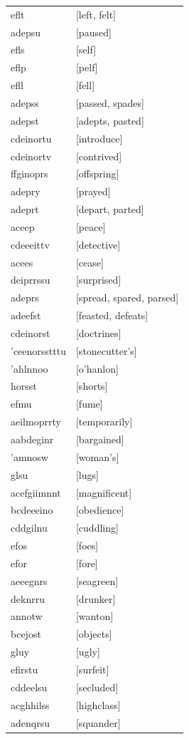 \documentclass{article}
\begin{document}
\begin{tabular}{ll}
eflt & [left, felt] \\
adepsu & [paused] \\
efls & [self] \\
eflp & [pelf] \\
efll & [fell] \\
adepss & [passed, spades] \\
adepst & [adepts, pasted] \\
cdeinortu & [introduce] \\
cdeinortv & [contrived] \\
ffginoprs & [offspring] \\
adepry & [prayed] \\
adeprt & [depart, parted] \\
aceep & [peace] \\
cdeeeittv & [detective] \\
acees & [cease] \\
deiprrssu & [surprised] \\
adeprs & [spread, spared, parsed] \\
adeefst & [feasted, defeats] \\
cdeinorst & [doctrines] \\
'ceenorsstttu & [stonecutter's] \\
'ahlnnoo & [o'hanlon] \\
horsst & [shorts] \\
efmu & [fume] \\
aeilmoprrty & [temporarily] \\
aabdeginr & [bargained] \\
'amnosw & [woman's] \\
glsu & [lugs] \\
acefgiimnnt & [magnificent] \\
bcdeeeino & [obedience] \\
cddgilnu & [cuddling] \\
efos & [foes] \\
efor & [fore] \\
aeeegnrs & [seagreen] \\
deknrru & [drunker] \\
annotw & [wanton] \\
bcejost & [objects] \\
gluy & [ugly] \\
efirstu & [surfeit] \\
cddeelsu & [secluded] \\
acghhilss & [highclass] \\
adenqrsu & [squander] \\

\end{tabular}
\end{document}
